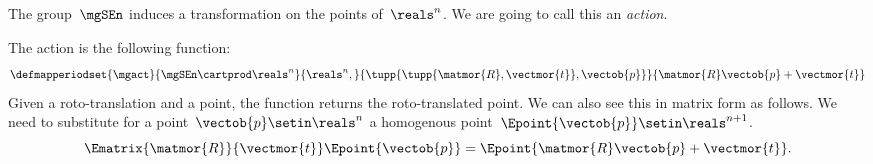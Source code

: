 %

The group~$\mgSEn$ induces a transformation on the points of~$\reals^n$.
We are going to call this an \emph{action}.

The action is the following function:
%
\begin{equation}
    \label{eq:apply}
    \defmapperiodset{\mgact}{
        \mgSEn \cartprod \reals^n
    }{
        \reals^n,
    }{
        \tupp{ \tupp{\matmor{R}, \vectmor{t}}, \vectob{p}}
    }{
        \matmor{R}\vectob{p} + \vectmor{t}
    }
\end{equation}
Given a roto-translation and a point, the function returns the roto-translated point.
%
We can also see this in matrix form as follows.
We need to substitute for a point~$\vectob{p} \setin \reals^n$ a homogenous point~$\Epoint{\vectob{p}} \setin \reals^{n+1}$.
%
\begin{equation}
    \label{eq:homogenous}
    \Ematrix{\matmor{R}}{\vectmor{t}}
    \Epoint{\vectob{p}}
    =
    \Epoint{\matmor{R}\vectob{p} + \vectmor{t}}.
\end{equation}
%

